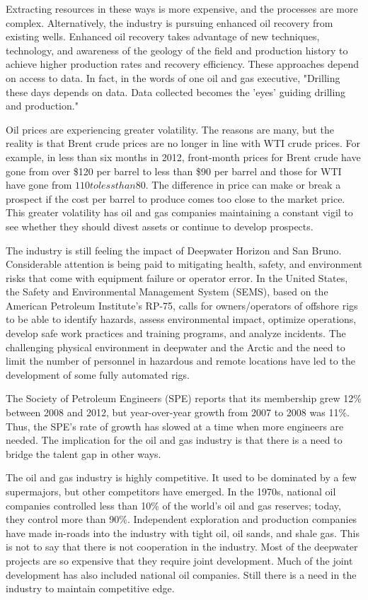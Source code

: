 \documentclass[twocolumn]{article}
\begin{document}
Extracting resources in these ways is more expensive, and the processes are more complex. Alternatively, the industry is pursuing enhanced oil recovery from existing wells. Enhanced oil recovery takes advantage of new techniques, technology, and awareness of the geology of the field and production history to achieve higher production rates and recovery efficiency. These approaches depend on access to data. In fact, in the words of one oil and gas executive, "Drilling these days depends on data. Data collected becomes the 'eyes' guiding drilling and production."

Oil prices are experiencing greater volatility. The reasons are many, but the reality is that Brent crude prices are no longer in line with WTI crude prices. For example, in less than six months in 2012, front-month prices for Brent crude have gone from over \$120 per barrel to less than \$90 per barrel and those for WTI have gone from $110 to less than $80. The difference in price can make or break a prospect if the cost per barrel to produce comes too close to the market price. This greater volatility has oil and gas companies maintaining a constant vigil to see whether they should divest assets or continue to develop prospects.

The industry is still feeling the impact of Deepwater Horizon and San Bruno. Considerable attention is being paid to mitigating health, safety, and environment risks that come with equipment failure or operator error. In the United States, the Safety and Environmental Management System (SEMS), based on the American Petroleum Institute's RP-75, calls for owners/operators of offshore rigs to be able to identify hazards, assess environmental impact, optimize operations, develop safe work practices and training programs, and analyze incidents. The challenging physical environment in deepwater and the Arctic and the need to limit the number of personnel in hazardous and remote locations have led to the development of some fully automated rigs.

The Society of Petroleum Engineers (SPE) reports that its membership grew 12\% between 2008 and 2012, but year-over-year growth from 2007 to 2008 was 11\%. Thus, the SPE's rate of growth has slowed at a time when more engineers are needed. The implication for the oil and gas industry is that there is a need to bridge the talent gap in other ways.

The oil and gas industry is highly competitive. It used to be dominated by a few supermajors, but other competitors have emerged. In the 1970s, national oil companies controlled less than 10\% of the world's oil and gas reserves; today, they control more than 90\%. Independent exploration and production companies have made in-roads into the industry with tight oil, oil sands, and shale gas. This is not to say that there is not cooperation in the industry. Most of the deepwater projects are so expensive that they require joint development. Much of the joint development has also included national oil companies. Still there is a need in the industry to maintain competitive edge.
\end{document}
